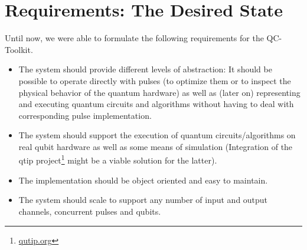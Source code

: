 \documentclass[a4paper,12pt]{article}
\begin{document}

\section{Requirements: The Desired State}
\label{sec:Requirements}
Until now, we were able to formulate the following requirements for the QC-Toolkit.
\begin{itemize} \itemsep-0.5pt
 \item The system should provide different levels of abstraction: It should be possible to operate directly with pulses (to optimize them or to inspect the physical behavior of the quantum hardware) as well as (later on) representing and executing quantum circuits and algorithms without having to deal with corresponding pulse implementation.
  \item The system should support the execution of quantum circuits/algorithms on real qubit hardware as well as some means of simulation (Integration of the qtip project\footnote{\href{http://qutip.org/}{qutip.org}} might be a viable solution for the latter).
  \item The implementation should be object oriented and easy to maintain.
  \item The system should scale to support any number of input and output channels, concurrent pulses and qubits.
\end{itemize}
\end{document}
